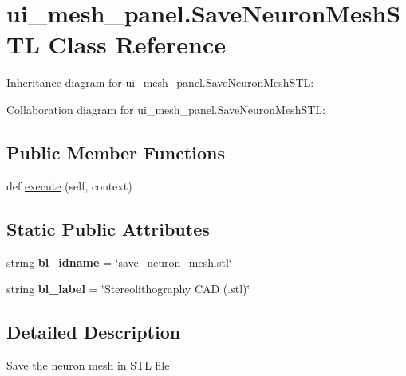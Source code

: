\hypertarget{classui__mesh__panel_1_1SaveNeuronMeshSTL}{}\section{ui\+\_\+mesh\+\_\+panel.\+Save\+Neuron\+Mesh\+S\+TL Class Reference}
\label{classui__mesh__panel_1_1SaveNeuronMeshSTL}


Inheritance diagram for ui\+\_\+mesh\+\_\+panel.\+Save\+Neuron\+Mesh\+S\+TL\+:


Collaboration diagram for ui\+\_\+mesh\+\_\+panel.\+Save\+Neuron\+Mesh\+S\+TL\+:
\subsection*{Public Member Functions}
\begin{DoxyCompactItemize}
\item 
def \hyperlink{classui__mesh__panel_1_1SaveNeuronMeshSTL_a15d74f97e9a28ed047a10d7fed5b793d}{execute} (self, context)
\end{DoxyCompactItemize}
\subsection*{Static Public Attributes}
\begin{DoxyCompactItemize}
\item 
string {\bfseries bl\+\_\+idname} = \char`\"{}save\+\_\+neuron\+\_\+mesh.\+stl\char`\"{}\hypertarget{classui__mesh__panel_1_1SaveNeuronMeshSTL_a194c5f9cdc6bc77f58dc74e58a39324b}{}\label{classui__mesh__panel_1_1SaveNeuronMeshSTL_a194c5f9cdc6bc77f58dc74e58a39324b}

\item 
string {\bfseries bl\+\_\+label} = \char`\"{}Stereolithography C\+AD (.stl)\char`\"{}\hypertarget{classui__mesh__panel_1_1SaveNeuronMeshSTL_aa04f29734e8e6adc1182cf688aed12a8}{}\label{classui__mesh__panel_1_1SaveNeuronMeshSTL_aa04f29734e8e6adc1182cf688aed12a8}

\end{DoxyCompactItemize}


\subsection{Detailed Description}
\begin{DoxyVerb}Save the neuron mesh in STL file\end{DoxyVerb}
 

